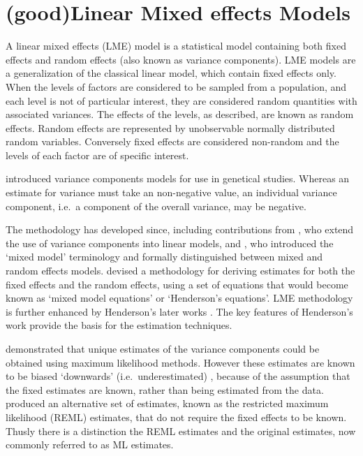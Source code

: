 \documentclass[12pt, a4paper]{report}
\theoremstyle{plain}
\theoremstyle{definition}
\theoremstyle{remark}
\begin{document}
			\section{ (good)Linear Mixed effects Models}
			A linear mixed effects (LME) model is a statistical model containing both fixed effects and random effects (also known as variance components). LME models are a generalization of the classical linear model, which contain fixed effects only. When the levels of factors are considered to be sampled from a population,
			and each level is not of particular interest, they are considered random quantities with associated variances.
			The effects of the levels, as described, are known as random effects. Random effects are represented by unobservable
			normally distributed random variables. Conversely fixed effects are considered non-random and the
			levels of each factor are of specific interest.
			
			\citet{Fisher4} introduced variance components models for use in genetical studies. Whereas an estimate for variance must take an non-negative value, an individual variance component, i.e.\ a component of the overall variance, may be negative.
			
			The methodology has developed since, including contributions from
			\citet{tippett}, who extend the use of variance components into linear models, and \citet{eisenhart}, who introduced the `mixed model' terminology and formally distinguished between mixed and random effects models. \citet{Henderson:1950} devised a methodology for deriving estimates for both the fixed effects and the random effects, using a set of equations that would become known as `mixed model equations' or `Henderson's equations'.
			LME methodology is further enhanced by Henderson's later works \citep{Henderson53, Henderson59,Henderson63,Henderson73,Henderson84a}. The key features of Henderson's work provide the basis for the estimation techniques.
			
			\citet{HartleyRao} demonstrated that unique estimates of the variance components could be obtained using maximum likelihood methods. However these estimates are known to be biased `downwards' (i.e.\ underestimated) , because of the assumption that the fixed estimates are known, rather than being estimated from the data. \citet{PattersonThompson} produced an alternative set of estimates, known as the restricted maximum likelihood (REML) estimates, that do not require the fixed effects to be known. Thusly there is a distinction the REML estimates and the original estimates, now commonly referred to as ML estimates.
			
\end{document}
